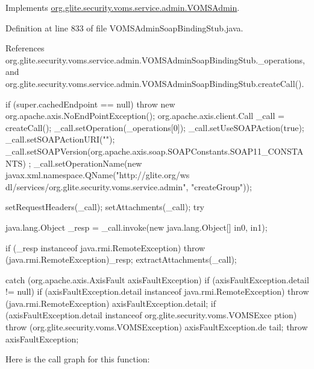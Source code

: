 Implements \hyperlink{interfaceorg_1_1glite_1_1security_1_1voms_1_1service_1_1admin_1_1VOMSAdmin_a63cdf7b5f384d24b9680763e08562a5f}{org.glite.security.voms.service.admin.VOMSAdmin}.



Definition at line 833 of file VOMSAdminSoapBindingStub.java.



References org.glite.security.voms.service.admin.VOMSAdminSoapBindingStub.\_\-operations, and org.glite.security.voms.service.admin.VOMSAdminSoapBindingStub.createCall().


\begin{DoxyCode}
                                                                                 
                                                                    {
        if (super.cachedEndpoint == null) {
            throw new org.apache.axis.NoEndPointException();
        }
        org.apache.axis.client.Call _call = createCall();
        _call.setOperation(_operations[0]);
        _call.setUseSOAPAction(true);
        _call.setSOAPActionURI("");
        _call.setSOAPVersion(org.apache.axis.soap.SOAPConstants.SOAP11_CONSTANTS)
      ;
        _call.setOperationName(new javax.xml.namespace.QName("http://glite.org/ws
      dl/services/org.glite.security.voms.service.admin", "createGroup"));

        setRequestHeaders(_call);
        setAttachments(_call);
 try {        java.lang.Object _resp = _call.invoke(new java.lang.Object[] {in0, 
      in1});

        if (_resp instanceof java.rmi.RemoteException) {
            throw (java.rmi.RemoteException)_resp;
        }
        extractAttachments(_call);
  } catch (org.apache.axis.AxisFault axisFaultException) {
    if (axisFaultException.detail != null) {
        if (axisFaultException.detail instanceof java.rmi.RemoteException) {
              throw (java.rmi.RemoteException) axisFaultException.detail;
         }
        if (axisFaultException.detail instanceof org.glite.security.voms.VOMSExce
      ption) {
              throw (org.glite.security.voms.VOMSException) axisFaultException.de
      tail;
         }
   }
  throw axisFaultException;
}
    }
\end{DoxyCode}


Here is the call graph for this function:


